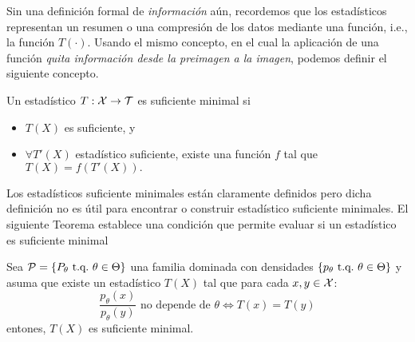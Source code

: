 Sin una definición formal de \textit{información} aún, recordemos que los estadísticos representan un resumen o una compresión  de los datos mediante una función, i.e., la función $T(\cdot)$. Usando el mismo concepto, en el cual la aplicación de una función \textit{quita información desde la preimagen a la imagen}, podemos definir el siguiente concepto. 

\begin{definition}
	Un estadístico $T:{\mathcal X}\rightarrow{\mathcal T}$ es suficiente minimal si

	\begin{itemize}
		\item $T(X)$ es suficiente, y
		\item $\forall T'(X)$ estadístico suficiente, existe una función $f$ tal que $T(X) = f(T'(X)).$ 
	\end{itemize}
\end{definition}  





 \noindent {} 

Los estadísticos suficiente minimales están claramente definidos pero dicha definición no es útil para encontrar o construir  estadístico suficiente minimales. El siguiente Teorema establece una condición que permite evaluar si un estadístico es suficiente minimal 

\begin{theorem}
	\label{teo:suficiencia_minimal}
	Sea $\mathcal{P} = \{P_\theta\ {\text{t.q.}}\ \theta\in\Theta\}$ una familia dominada con densidades $\{p_\theta\ {\text{t.q.}}\ \theta\in\Theta\}$ y asuma que existe un estadístico $T(X)$ tal que para cada $x,y\in{\mathcal X}$:
	\begin{equation}
		\frac{p_\theta(x)}{p_\theta(y)} \text{ no depende de }\theta \Leftrightarrow T(x) = T(y)
	\end{equation}
	entones, $T(X)$ es suficiente minimal.
\end{theorem}

